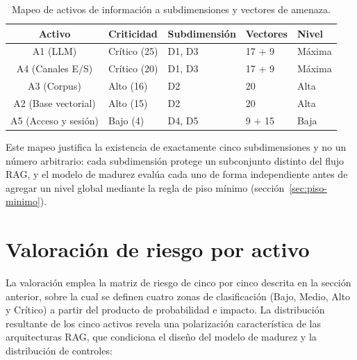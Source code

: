 \begin{table}[H]
  \centering
  \caption{Mapeo de activos de información a subdimensiones y vectores de amenaza.}
  \label{tab:mapeo-activos-subdim}
  \begin{tabularx}{\textwidth}{@{} c l l l l @{}}  %
    \toprule
    \textbf{Activo} & \textbf{Criticidad} & \textbf{Subdimensión} & \textbf{Vectores} & \textbf{Nivel} \\
    \midrule
    A1 (LLM)             & Crítico (25) & D1, D3 & 17 + 9 & Máxima \\
    A4 (Canales E/S)     & Crítico (20) & D1, D3 & 17 + 9 & Máxima \\
    A3 (Corpus)           & Alto (16) & D2     & 20      & Alta \\
    A2 (Base vectorial)   & Alto (15) & D2     & 20      & Alta \\
    A5 (Acceso y sesión)  & Bajo (4) & D4, D5 & 9 + 15 & Baja \\
    \bottomrule
  \end{tabularx}
\end{table}

\vspace{6pt}

Este mapeo justifica la existencia de exactamente cinco subdimensiones y no un número arbitrario: cada subdimensión protege un subconjunto distinto del flujo RAG, y el modelo de madurez evalúa cada uno de forma independiente antes de agregar un nivel global mediante la regla de piso mínimo (sección~\ref{sec:piso-minimo}).

\section{Valoración de riesgo por activo}
\label{sec:valoracion-riesgo}

La valoración emplea la matriz de riesgo de cinco por cinco descrita en la sección anterior, sobre la cual se definen cuatro zonas de clasificación (Bajo, Medio, Alto y Crítico) a partir del producto de probabilidad e impacto. La distribución resultante de los cinco activos revela una polarización característica de las arquitecturas RAG, que condiciona el diseño del modelo de madurez y la distribución de controles:

